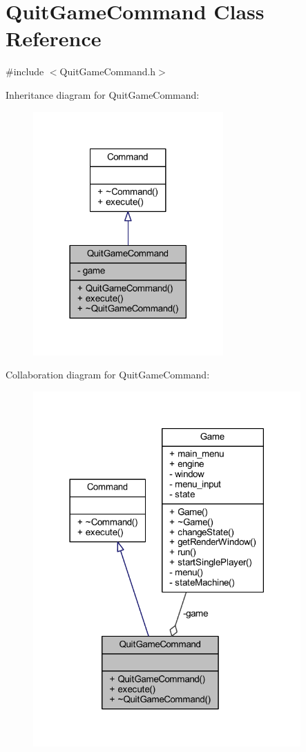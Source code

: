 \hypertarget{class_quit_game_command}{}\section{Quit\+Game\+Command Class Reference}
\label{class_quit_game_command}


{\ttfamily \#include $<$Quit\+Game\+Command.\+h$>$}



Inheritance diagram for Quit\+Game\+Command\+:\nopagebreak
\begin{figure}[H]
\begin{center}
\leavevmode
\includegraphics[width=206pt]{class_quit_game_command__inherit__graph}
\end{center}
\end{figure}


Collaboration diagram for Quit\+Game\+Command\+:\nopagebreak
\begin{figure}[H]
\begin{center}
\leavevmode
\includegraphics[width=290pt]{class_quit_game_command__coll__graph}
\end{center}
\end{figure}
